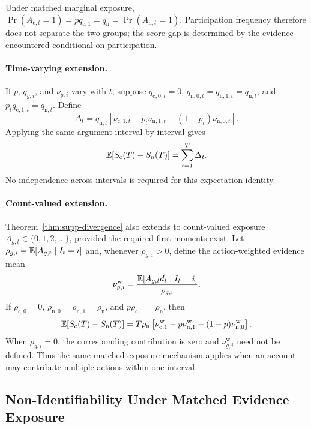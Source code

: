 Under matched marginal exposure,
$\Pr(A_{\mathrm c,t}=1)=p q_{\mathrm c,1}
=q_{\mathrm n}=\Pr(A_{\mathrm n,t}=1)$.
Participation frequency therefore does not separate the two groups; the score
gap is determined by the evidence encountered conditional on participation.

\paragraph{Time-varying extension.}
If $p$, $q_{g,i}$, and $\nu_{g,i}$ vary with $t$, suppose
$q_{\mathrm c,0,t}=0$,
$q_{\mathrm n,0,t}=q_{\mathrm n,1,t}=q_{\mathrm n,t}$, and
$p_tq_{\mathrm c,1,t}=q_{\mathrm n,t}$. Define
\[
\Delta_t
=
q_{\mathrm n,t}
\left[
\nu_{\mathrm c,1,t}
-
p_t\nu_{\mathrm n,1,t}
-
(1-p_t)\nu_{\mathrm n,0,t}
\right].
\]
Applying the same argument interval by interval gives
\begin{equation}
\label{eq:supp-nonstationary-gap}
\mathbb{E}[S_{\mathrm c}(T)-S_{\mathrm n}(T)]
=
\sum_{t=1}^{T}\Delta_t.
\end{equation}
No independence across intervals is required for this expectation identity.

\paragraph{Count-valued extension.}
Theorem~\ref{thm:supp-divergence} also extends to count-valued exposure
$A_{g,t}\in\{0,1,2,\ldots\}$, provided the required first moments
exist. Let
$\rho_{g,i}=\mathbb{E}[A_{g,t}\mid I_t=i]$ and, whenever
$\rho_{g,i}>0$, define the action-weighted evidence mean
\[
\nu^{\mathrm w}_{g,i}
=
\frac{\mathbb{E}[A_{g,t}d_t\mid I_t=i]}{\rho_{g,i}}.
\]
If $\rho_{\mathrm c,0}=0$,
$\rho_{\mathrm n,0}=\rho_{\mathrm n,1}=\rho_{\mathrm n}$, and
$p\rho_{\mathrm c,1}=\rho_{\mathrm n}$, then
\[
\mathbb{E}\!\left[
S_{\mathrm c}(T)-S_{\mathrm n}(T)
\right]
=
T\rho_{\mathrm n}
\left[
\nu^{\mathrm w}_{\mathrm c,1}
-p\nu^{\mathrm w}_{\mathrm n,1}
-(1-p)\nu^{\mathrm w}_{\mathrm n,0}
\right].
\]
When $\rho_{g,i}=0$, the corresponding contribution is zero and
$\nu^{\mathrm w}_{g,i}$ need not be defined. Thus the same
matched-exposure mechanism applies when an account may contribute
multiple actions within one interval.

\subsection{Non-Identifiability Under Matched Evidence Exposure}
\label{sec:supp-nonidentifiability}

